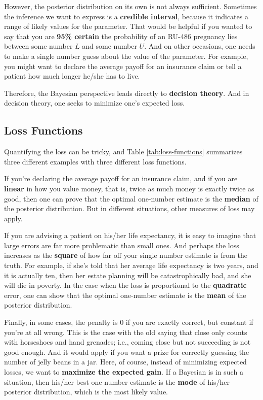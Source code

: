 \documentclass[]{book}
\theoremstyle{definition}
\theoremstyle{definition}
\theoremstyle{definition}
\theoremstyle{remark}
\begin{document}
However, the posterior distribution on its own is not always sufficient.
Sometimes the inference we want to express is a \textbf{credible
interval}, because it indicates a range of likely values for the
parameter. That would be helpful if you wanted to say that you are
\textbf{95\% certain} the probability of an RU-486 pregnancy lies
between some number \(L\) and some number \(U\). And on other occasions,
one needs to make a single number guess about the value of the
parameter. For example, you might want to declare the average payoff for
an insurance claim or tell a patient how much longer he/she has to live.

Therefore, the Bayesian perspective leads directly to \textbf{decision
theory}. And in decision theory, one seeks to minimize one's expected
loss.

\subsection{Loss Functions}\label{loss-functions}

Quantifying the loss can be tricky, and Table \ref{tab:loss-functions}
summarizes three different examples with three different loss functions.

If you're declaring the average payoff for an insurance claim, and if
you are \textbf{linear} in how you value money, that is, twice as much
money is exactly twice as good, then one can prove that the optimal
one-number estimate is the \textbf{median} of the posterior
distribution. But in different situations, other measures of loss may
apply.

If you are advising a patient on his/her life expectancy, it is easy to
imagine that large errors are far more problematic than small ones. And
perhaps the loss increases as the \textbf{square} of how far off your
single number estimate is from the truth. For example, if she's told
that her average life expectancy is two years, and it is actually ten,
then her estate planning will be catastrophically bad, and she will die
in poverty. In the case when the loss is proportional to the
\textbf{quadratic} error, one can show that the optimal one-number
estimate is the \textbf{mean} of the posterior distribution.

Finally, in some cases, the penalty is 0 if you are exactly correct, but
constant if you're at all wrong. This is the case with the old saying
that close only counts with horseshoes and hand grenades; i.e., coming
close but not succeeding is not good enough. And it would apply if you
want a prize for correctly guessing the number of jelly beans in a jar.
Here, of course, instead of minimizing expected losses, we want to
\textbf{maximize the expected gain}. If a Bayesian is in such a
situation, then his/her best one-number estimate is the \textbf{mode} of
his/her posterior distribution, which is the most likely value.
\end{document}
